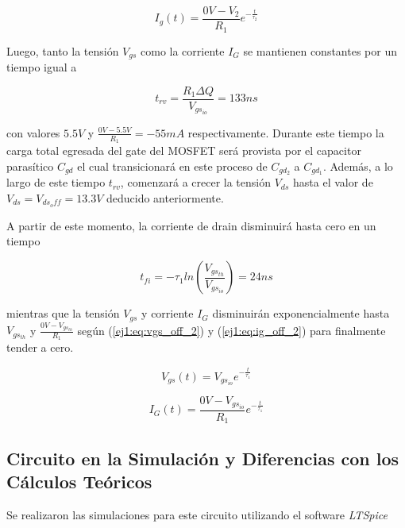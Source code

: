 \begin{equation}
I_{g}(t) = \frac{0V-V_2}{R_1} e^{-\frac{t}{\tau_2}}
\label{ej1:eq:ig_off_1}
\end{equation}

Luego, tanto la tensión $V_{gs}$ como la corriente $I_G$ se mantienen constantes por un tiempo igual a 

\begin{equation}
t_{rv} = \frac{R_1 \Delta Q}{V_{gs_{io}}} = 133ns
\label{ej1:eq:trv}
\end{equation}

con valores $5.5V$ y $\frac{0V-5.5V}{R_1} = -55mA$ respectivamente. Durante este tiempo la carga total egresada del gate del MOSFET será provista por el capacitor parasítico $C_{gd}$ el cual transicionará en este proceso de $C_{gd_2}$ a $C_{gd_1}$. Además, a lo largo de este tiempo $t_{rv}$, comenzará a crecer la tensión $V_{ds}$ hasta el valor de $V_{ds} = V_{ds_off} = 13.3V$ deducido anteriormente.

A partir de este momento, la corriente de drain disminuirá hasta cero en un tiempo

\begin{equation}
t_{fi} = -\tau_1 ln\left( \frac{V_{gs_{th}}}{V_{gs_{io}}} \right) = 24ns
\label{ej1:eq:tfi}
\end{equation}

mientras que la tensión $V_{gs}$ y corriente $I_G$ disminuirán exponencialmente hasta $V_{gs_{th}}$ y $\frac{0V-V_{gs_{th}}}{R_1}$ según (\ref{ej1:eq:vgs_off_2}) y (\ref{ej1:eq:ig_off_2}) para finalmente tender a cero.

\begin{equation}
V_{gs}(t) = V_{gs_{io}} e^{-\frac{t}{\tau_1}}
\label{ej1:eq:vgs_off_2}
\end{equation}

\begin{equation}
I_{G}(t) = \frac{0V-V_{gs_{io}}}{R_1} e^{-\frac{t}{\tau_1}}
\label{ej1:eq:ig_off_2}
\end{equation}

\subsection{Circuito en la Simulación y Diferencias con los Cálculos Teóricos}

Se realizaron las simulaciones para este circuito utilizando el software \textit{LTSpice} %
%

